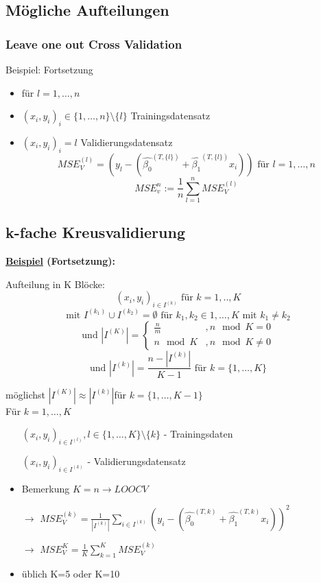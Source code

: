 \subsection{Mögliche Aufteilungen}
\subsubsection{Leave one out Cross Validation}
Beispiel: Fortsetzung
\begin{itemize}
	\item für \(l = 1,\ldots,n\) 
	\item $(x_i, y_i)_i \in \{1, \ldots, n \} \setminus \{l\}$ Trainingsdatensatz
	\item $(x_i, y_i)_i = l$ Validierungsdatensatz
	\[MSE_V^{(l)} = (y_l - (\hat{\beta_0}^{(T, \{l\})} + \hat{\beta_1}^{(T, \{l\})} x_i)) \text{ für } l = 1,\ldots ,n\]	
	\[MSE_v^n := \frac{1}{n}\sum_{l = 1}^{n} MSE_V^{(l)}\]
\end{itemize}

\subsection{k-fache Kreusvalidierung}
\textbf{\underline{Beispiel} (Fortsetzung):}

Aufteilung in K Blöcke:
\[(x_i, y_i)_{i \in I^{(k)}} \text{ für }  k = 1, .., K \] 
\[\text{mit } I^{(k_1)} \cup I^{(k_2)} = \emptyset \text{ für } k_1, k_2 \in {1, \ldots ,K} \text{ mit } k_1 \neq k_2 \]
\[ \text{und } |I^{(K)}| = \begin{cases}
\frac{n}{m} &, n \mod K= 0\\
n \mod K &, n \mod K \neq 0
\end{cases}
\]
\[\text{und } |I^{(k)}| = \frac{n - |I^{(k)}|}{K-1} \text{ für } k = \{1, \ldots ,K\} \]

möglichst \(|I^{(K)}| \approx |I^{(k)}|\)für \(k = \{1, \ldots ,K-1\}\)\\


Für \(k = 1, \ldots, K\) 
\begin{itemize}
	\item[] \((x_i, y_i)_{ i \in I^{(l)}}, l \in \{1, \ldots, K\}\setminus \{k\}\) - Trainingsdaten
	\item[] \((x_i, y_i)_{ i \in I^{(k)}} \) - Validierungsdatensatz
	\item Bemerkung \(K=n \rightarrow LOOCV\) 	
	\item[\(\rightarrow\)]\(MSE_V^{(k)} = \frac{1}{|I^{(k)}|} \sum_{i \in I^{(k)}} ( y_i -( \hat{\beta_0}^{(T,k)} + \hat{\beta_1}^{(T,k)}  x_i))^2\) 
	\item [\(\rightarrow\)]
	\(MSE_V^K = \frac{1}{K} \sum_{k=1}^{K} MSE_V^{(k)}\) 
	\item üblich K=5 oder K=10
\end{itemize}


